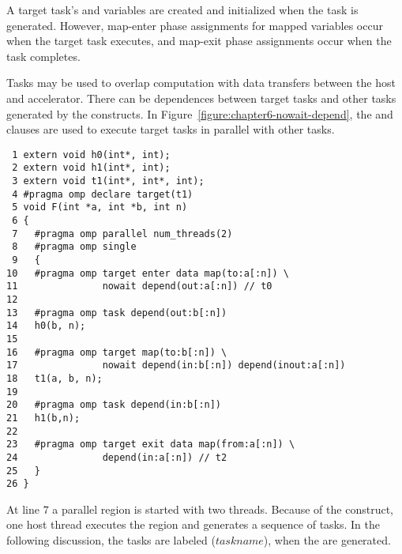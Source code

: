 A target task's  and  variables are created and initialized
when the task is generated.  However, map-enter phase assignments for mapped
variables occur when the target task executes, and map-exit phase assignments
occur when the task completes. 

Tasks may be used to overlap computation with data transfers between the host
and accelerator.  There can be dependences between target tasks and other tasks
generated by the  constructs.  In
Figure~\ref{figure:chapter6-nowait-depend}, the  and
 clauses are used to execute target tasks in parallel with other tasks.

\begin{figure*}[!tb]
\begin{verbatim}
 1 extern void h0(int*, int);
 2 extern void h1(int*, int);
 3 extern void t1(int*, int*, int);
 4 #pragma omp declare target(t1)
 5 void F(int *a, int *b, int n)
 6 {
 7   #pragma omp parallel num_threads(2)
 8   #pragma omp single
 9   {
10   #pragma omp target enter data map(to:a[:n]) \
11               nowait depend(out:a[:n]) // t0
12 
13   #pragma omp task depend(out:b[:n])
14   h0(b, n);
15 
16   #pragma omp target map(to:b[:n]) \
17               nowait depend(in:b[:n]) depend(inout:a[:n])
18   t1(a, b, n);
19 
20   #pragma omp task depend(in:b[:n])
21   h1(b,n);
22 
23   #pragma omp target exit data map(from:a[:n]) \
24               depend(in:a[:n]) // t2
25   }
26 }
\end{verbatim}
\caption{ \textbf {Example using the nowait and depend clauses } -- \small
          Use the \texttt{depend} and \texttt{nowait} clauses to execute target
          tasks in parallel with other host tasks.
         }
\label{figure:chapter6-nowait-depend}
\end{figure*}

At line $7$ a parallel region is started with two threads.  Because of the
 construct, one host thread executes the region and generates a
sequence of tasks.  
In the following discussion, the tasks are labeled ($task name$), when
the are generated.

